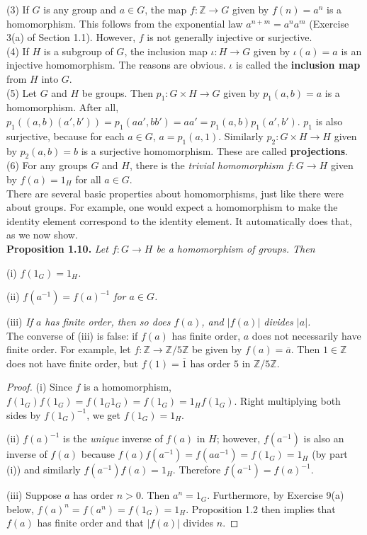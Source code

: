 \documentclass[leqno]{book}
\begin{document}
(3) If $G$ is any group and $a\in G$, the map $f:\mathbb Z\to G$ given by $f(n)=a^n$ is a homomorphism.  This follows from the exponential law $a^{n+m}=a^na^m$ (Exercise 3(a) of Section 1.1).  However, $f$ is not generally injective or surjective.\\

(4) If $H$ is a subgroup of $G$, the inclusion map $\iota:H\to G$ given by $\iota(a)=a$ is an injective homomorphism.  The reasons are obvious.  $\iota$ is called the \textbf{inclusion map} from $H$ into $G$.\\

(5) Let $G$ and $H$ be groups.  Then $p_1:G\times H\to G$ given by $p_1(a,b)=a$ is a homomorphism.  After all, $p_1((a,b)(a',b'))=p_1(aa',bb')=aa'=p_1(a,b)p_1(a',b')$.  $p_1$ is also surjective, because for each $a\in G$, $a=p_1(a,1)$.  Similarly $p_2:G\times H\to H$ given by $p_2(a,b)=b$ is a surjective homomorphism.  These are called \textbf{projections}.\\

(6) For any groups $G$ and $H$, there is the \emph{trivial homomorphism} $f:G\to H$ given by $f(a)=1_H$ for all $a\in G$.\\

\noindent There are several basic properties about homomorphisms, just like there were about groups.  For example, one would expect a homomorphism to make the identity element correspond to the identity element.  It automatically does that, as we now show.\\

\noindent\textbf{Proposition 1.10.} \emph{Let $f:G\to H$ be a homomorphism of groups.  Then}

(i) \emph{$f(1_G)=1_H$.}

(ii) \emph{$f(a^{-1})=f(a)^{-1}$ for $a\in G$.}

(iii) \emph{If $a$ has finite order, then so does $f(a)$, and $|f(a)|$ divides $|a|$.}\\

\noindent The converse of (iii) is false: if $f(a)$ has finite order, $a$ does not necessarily have finite order.  For example, let $f:\mathbb Z\to\mathbb Z/5\mathbb Z$ be given by $f(a)=\overline a$.  Then $1\in\mathbb Z$ does not have finite order, but $f(1)=\overline 1$ has order $5$ in $\mathbb Z/5\mathbb Z$.
\begin{proof}
(i) Since $f$ is a homomorphism, $f(1_G)f(1_G)=f(1_G1_G)=f(1_G)=1_Hf(1_G)$.  Right multiplying both sides by $f(1_G)^{-1}$, we get $f(1_G)=1_H$.

(ii) $f(a)^{-1}$ is the \emph{unique} inverse of $f(a)$ in $H$; however, $f(a^{-1})$ is also an inverse of $f(a)$ because $f(a)f(a^{-1})=f(aa^{-1})=f(1_G)=1_H$ (by part (i)) and similarly $f(a^{-1})f(a)=1_H$.  Therefore $f(a^{-1})=f(a)^{-1}$.

(iii) Suppose $a$ has order $n>0$.  Then $a^n=1_G$.  Furthermore, by Exercise 9(a) below, $f(a)^n=f(a^n)=f(1_G)=1_H$.  Proposition 1.2 then implies that $f(a)$ has finite order and that $|f(a)|$ divides $n$.
\end{proof}
\end{document}
